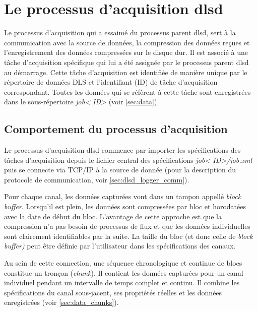 \documentclass[a4paper,12pt,BCOR6mm,bibtotoc,idxtotoc]{scrbook}
\begin{document}

\section{Le processus d'acquisition dlsd}
\label{sec:dlsd_logger}

Le processus d'acquisition qui a essaim\'e du processus parent dlsd,
sert \`a la communication avec la source de donn\'ees, la compression
des donn\'ees re\c cues et l'enregistrement des donn\'ees
compress\'ees sur le disque dur.  Il est associ\'e \`a une t\^ache
d'acquisition sp\'ecifique qui lui a \'et\'e
assign\'ee par le processus parent dlsd au d\'emarrage.  Cette t\^ache
d'acquisition est identifi\'ee de mani\`ere unique par le r\'epertoire
de donn\'ees DLS et l'identifiant (ID) de t\^ache d'acquisition
correspondant.  Toutes les donn\'ees qui se r\'ef\`erent \`a cette t\^ache
sont enregistr\'ees dans le sous-r\'epertoire \textit{job\textless
  ID\textgreater} (voir \autoref{sec:data}).


\subsection{Comportement du processus d'acquisition}
\label{sec:dlsd_logger_behaviour}

Le processus d'acquisition dlsd commence par importer les
sp\'ecifications des t\^aches d'acquisition
depuis le fichier central des sp\'ecifications \textit{job\textless
  ID\textgreater/job.xml} puis se connecte via TCP/IP \`a la source de
donn\'ee (pour la description du protocole de communication, voir
\autoref{sec:dlsd_logger_comm}).

Pour chaque canal, les donn\'ees captur\'ees vont dans un tampon
appell\'e \textit{block buffer}. Lorsqu'il est plein, les donn\'ees
sont compress\'ees par bloc et horodat\'ees avec la date de d\'ebut du
bloc. L'avantage de cette approche est que la compression n'a pas
besoin de processus de flux et que les donn\'ees individuelles sont
clairement identifiables par la suite. La taille du bloc (et donc celle de \textit{block buffer)} peut \^etre
d\'efinie par l'utilisateur dans les sp\'ecifications des canaux.


Au sein de cette connection, une s\'equence chronologique et continue
de blocs constitue un tron\c con
(\textit{chunk}). Il contient les donn\'ees
captur\'ees pour un canal individuel pendant un intervalle de temps
complet et continu.  Il combine les sp\'ecifications du canal
sous-jacent, ses propri\'et\'es r\'eelles et les donn\'ees
enregistr\'ees (voir \autoref{sec:data_chunks}).
\end{document}
